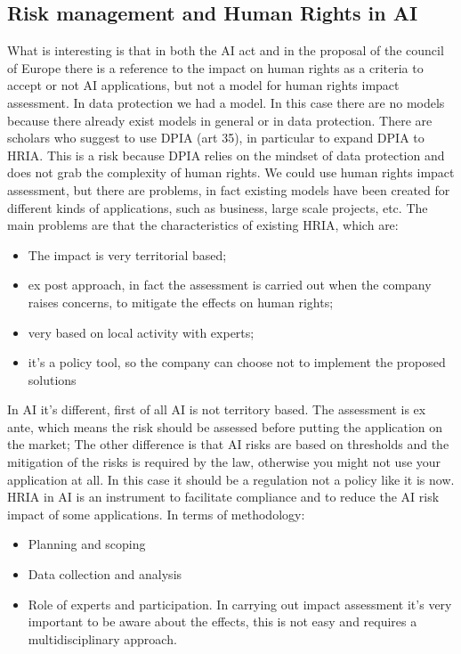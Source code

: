 \subsection{Risk management and Human Rights in AI}
What is interesting is that in both the AI act and in the proposal of the council of Europe there is a reference to the impact on human rights as a criteria to accept or not AI applications, but not a model for human rights impact assessment. In data protection we had a model. In this case there are no models because there already exist models in general or in data protection. There are scholars who suggest to use DPIA (art 35), in particular to expand DPIA to HRIA. This is a risk because DPIA relies on the mindset of data protection and does not grab the complexity of human rights. We could use human rights impact assessment, but there are problems, in fact existing models have been created for different kinds of applications, such as business, large scale projects, etc. 
The main problems are that the characteristics of existing HRIA, which are:
\begin{itemize}
    \item The impact is very territorial based;
    \item ex post approach, in fact the assessment is carried out when the company raises concerns, to mitigate the effects on human rights;
    \item very based on local activity with experts;
    \item it's a policy tool, so the company can choose not to implement the proposed solutions
\end{itemize}
In AI it's different, first of all AI is not territory based.
The assessment is ex ante, which means the risk should be assessed before putting the application on the market;
The other difference is that AI risks are based on thresholds and the mitigation of the risks is required by the law, otherwise you might not use your application at all. In this case it should be a regulation not a policy like it is now.
HRIA in AI is an instrument to facilitate compliance and to reduce the AI risk impact of some applications. In terms of methodology:
\begin{itemize}
    \item Planning and scoping
    \item Data collection and analysis
    \item Role of experts and participation. In carrying out impact assessment it's very important to be aware about the effects, this is not easy and requires a multidisciplinary approach.
\end{itemize}
